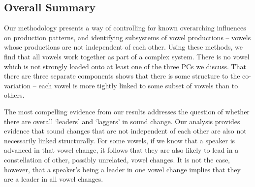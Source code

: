 \documentclass[review]{elsarticle} %
\begin{document}


\subsection{Overall Summary}

Our methodology presents a way of controlling for known overarching influences on production patterns, and identifying subsystems of vowel productions -- vowels whose productions are not independent of each other. Using these methods, we find that all vowels work together as part of a complex system. There is no vowel which is not strongly loaded onto at least one of the three PCs we discuss.  That there are three separate components shows that there is some structure to the co-variation -- each vowel is more tightly linked to some subset of vowels than to others.

The most compelling evidence from our results addresses the question of whether there are overall `leaders' and `laggers' in sound change.  Our analysis provides evidence that sound changes that are not independent of each other are also not necessarily linked structurally.  For some vowels, if we know that a speaker is advanced in that vowel change, it follows that they are also likely to lead in a constellation of other, possibly unrelated, vowel changes.   It is not the case, however, that a speaker's being a leader in one vowel change implies that they are a leader in all vowel changes.  
\end{document}
